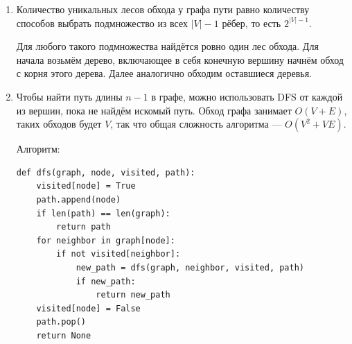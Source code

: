 \documentclass{article}
\begin{document}
\begin{enumerate}
\begin{itemize}
		      \item \textsc{peek} возвращает верхний
		            элемент стека за $O(1)$.
	      \end{itemize}

	      Реализация:

	      \begin{lstlisting}
class MinQueueStack:
    def __init__(self, elems: list[float]):
        self.stack = sorted(elems, reverse=True)

    def push(self, elem: float):
        temp_stack = []
        while len(self) > 0 and self.peek() < elem:
            temp_stack.append(self.pop())
        self.stack.append(elem)
        while len(temp_stack) > 0:
            self.stack.append(temp_stack.pop())

    def pop(self) -> float:
        return self.stack.pop(-1)

    def peek(self) -> float:
        return self.stack[-1]

    def __len__(self) -> int:
        return len(self.stack)
          \end{lstlisting}

	\item Количество уникальных лесов обхода у графа
	      пути равно количеству способов выбрать подмножество
	      из всех $\lvert V \rvert - 1$ рёбер,
	      то есть $2^{\lvert V \rvert - 1}$.

	      Для любого такого подмножества найдётся
	      ровно один лес обхода. Для начала возьмём
	      дерево, включающее в себя конечную
	      вершину начнём обход с корня этого дерева.
	      Далее аналогично обходим оставшиеся деревья.

	\item
	      Чтобы найти путь длины $n - 1$ в графе, можно
	      использовать \textsc{DFS} от каждой из
	      вершин, пока не найдём искомый путь.
	      Обход графа занимает $O(V + E)$, таких
	      обходов будет $V$, так что общая сложность
	      алгоритма --- $O(V^2 + VE)$.

	      Алгоритм:
	      \begin{lstlisting}
def dfs(graph, node, visited, path):
    visited[node] = True
    path.append(node)
    if len(path) == len(graph):
        return path
    for neighbor in graph[node]:
        if not visited[neighbor]:
            new_path = dfs(graph, neighbor, visited, path)
            if new_path:
                return new_path
    visited[node] = False
    path.pop()
    return None



\end{lstlisting}
\end{enumerate}
\end{document}
